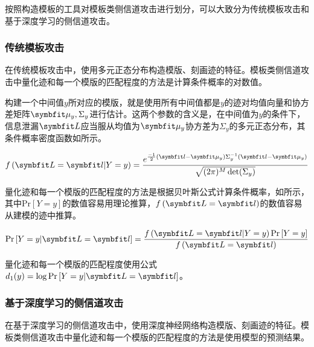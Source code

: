 {	按照构造模板的工具对模板类侧信道攻击进行划分，可以大致分为传统模板攻击和基于深度学习的侧信道攻击。
	\subsubsection{传统模板攻击}
	
	在传统模板攻击中，使用多元正态分布构造模版、刻画迹的特征。模板类侧信道攻击中量化迹和每一个模版的匹配程度的方法是计算条件概率的对数值。
	
	构建一个中间值$y$所对应的模版，就是使用所有中间值都是$y$的迹对均值向量和协方差矩阵$\Vector {\mu_y},\Sigma_y$进行估计。这两个参数的含义是，在中间值为$y$的条件下，信息泄漏$\Vector L$应当服从均值为$\Vector {\mu_y}$协方差为$\Sigma_y$的多元正态分布，其条件概率密度函数如所示。
	
	\begin{equation}\label{eq:f(b|a)}
		f\left(\Vector L=\Vector l|Y=y \right)=\frac{e^{\frac{-1}2(\Vector l-\Vector {\mu_y})\Sigma_y^{-1}(\Vector l-\Vector {\mu_y})}}{\sqrt{(2\pi)^M\det (\Sigma_y)}}
	\end{equation}
	
	
	量化迹和每一个模版的匹配程度的方法是根据贝叶斯公式计算条件概率，如所示，其中$\mathrm{Pr}\left[Y=y \right]$的数值容易用理论推算，$f\left(\Vector L=\Vector l\right)$的数值容易从建模的迹中推算。
	
	\begin{equation}\label{eq:pr(a|b)}
		\mathrm{Pr}\left[Y=y|\Vector L=\Vector l \right]=\frac{f\left(\Vector L=\Vector l|Y=y \right)\mathrm{Pr}\left[Y=y \right]}{f\left(\Vector L=\Vector l\right)}
	\end{equation}
	
	量化迹和每一个模版的匹配程度使用公式$d_1(y)=\log \mathrm{Pr}\left[Y=y|\Vector L=\Vector l \right]$。
	\subsubsection{基于深度学习的侧信道攻击}
	在基于深度学习的侧信道攻击中，使用深度神经网络构造模版、刻画迹的特征。模板类侧信道攻击中量化迹和每一个模版的匹配程度的方法是使用模型的预测结果。
	
}
